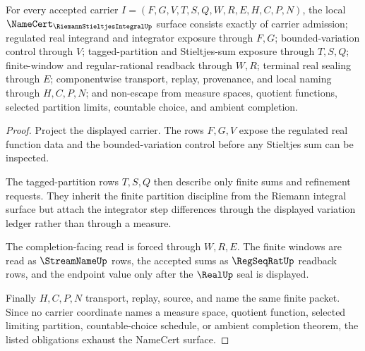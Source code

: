 \begin{theorem}
\label{thm:riemann-stieltjes-integral-namecert-obligations}
For every accepted carrier $I=(F,G,V,T,S,Q,W,R,E,H,C,P,N)$, the local $\NameCert_{\RiemannStieltjesIntegralUp}$ surface consists exactly of carrier admission; regulated real integrand and integrator exposure through $F,G$; bounded-variation control through $V$; tagged-partition and Stieltjes-sum exposure through $T,S,Q$; finite-window and regular-rational readback through $W,R$; terminal real sealing through $E$; componentwise transport, replay, provenance, and local naming through $H,C,P,N$; and non-escape from measure spaces, quotient functions, selected partition limits, countable choice, and ambient completion.
\end{theorem}
\begin{proof}
Project the displayed carrier. The rows $F,G,V$ expose the regulated real function data and the bounded-variation control before any Stieltjes sum can be inspected.

The tagged-partition rows $T,S,Q$ then describe only finite sums and refinement requests. They inherit the finite partition discipline from the Riemann integral surface but attach the integrator step differences through the displayed variation ledger rather than through a measure.

The completion-facing read is forced through $W,R,E$. The finite windows are read as $\StreamNameUp$ rows, the accepted sums as $\RegSeqRatUp$ readback rows, and the endpoint value only after the $\RealUp$ seal is displayed.

Finally $H,C,P,N$ transport, replay, source, and name the same finite packet. Since no carrier coordinate names a measure space, quotient function, selected limiting partition, countable-choice schedule, or ambient completion theorem, the listed obligations exhaust the NameCert surface.
\end{proof}

